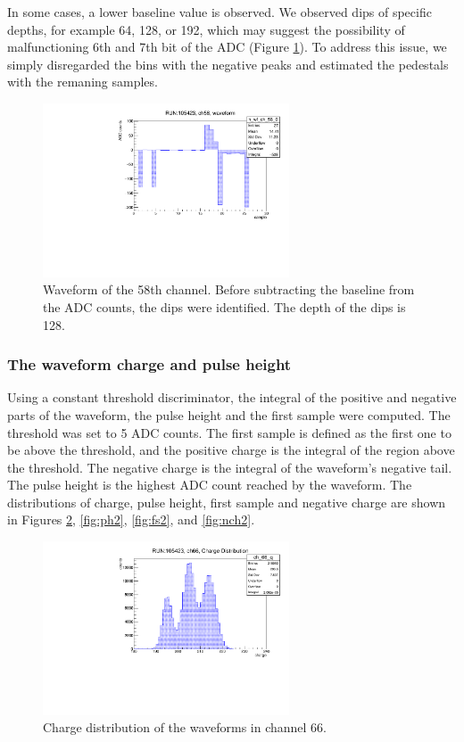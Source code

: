 In some cases, a lower baseline value is observed. We observed dips of specific depths, 
for example 64, 128, or 192, which may suggest the possibility of malfunctioning 6th 
and 7th bit of the ADC (Figure \ref{fig:dips}). 
To address this issue, we simply disregarded the bins with the 
negative peaks and estimated the pedestals with the remaning samples.
\begin{figure}[!h]
  \centering
  \includegraphics[width=0.65\textwidth]{figures/pdf/wf_ch58_1.pdf}
  \caption{Waveform of the 58th channel. Before subtracting 
  the baseline from the ADC counts, the dips were identified. The depth of the dips is 128.}
 \label{fig:dips}
\end{figure}
\subsubsection{The waveform charge and pulse height}\label{threshold}
Using a constant threshold discriminator, the integral of the positive and 
negative parts of the waveform, 
the pulse height and the first sample were computed. The threshold was set 
to 5 ADC counts. 
The first sample is defined as the first one to be above the threshold, 
and the positive charge 
is the integral of the region above the threshold. The negative charge 
is the integral of the waveform's 
negative tail. The pulse height is the highest ADC count reached 
by the waveform. The distributions of 
charge, pulse height, first sample and negative charge 
are shown in Figures \ref{fig:ch1}, \ref{fig:ph2}, \ref{fig:fs2}, and \ref{fig:nch2}.

\begin{figure}[!h]
      \centering
      \includegraphics[width=0.65\textwidth]{figures/pdf/charge.pdf}
      \caption{Charge distribution of the waveforms in channel 66.}
      \label{fig:ch1}
  \end{figure}

